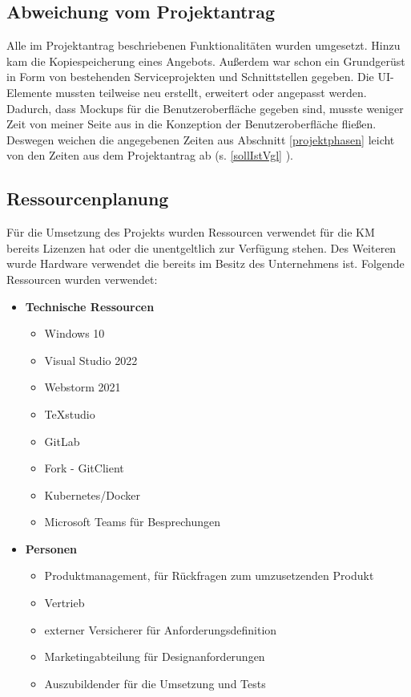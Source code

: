 {\subsection{Abweichung vom Projektantrag}
\label{abweichung}
Alle im Projektantrag beschriebenen Funktionalitäten wurden umgesetzt. Hinzu kam die Kopiespeicherung eines Angebots. Außerdem war schon ein Grundgerüst in Form von bestehenden Serviceprojekten und Schnittstellen gegeben. Die UI-Elemente mussten teilweise neu erstellt, erweitert oder angepasst werden.\\
Dadurch, dass Mockups für die Benutzeroberfläche gegeben sind, musste weniger Zeit von meiner Seite aus in die Konzeption der Benutzeroberfläche fließen. Deswegen weichen die angegebenen Zeiten aus Abschnitt \ref{projektphasen} leicht von den Zeiten aus dem Projektantrag ab (s. \ref{sollIstVgl} ). 
\subsection{Ressourcenplanung}
\label{ressourcenplanung}
Für die Umsetzung des Projekts wurden Ressourcen verwendet für die \ac{KM} bereits Lizenzen hat oder die unentgeltlich zur Verfügung stehen. Des Weiteren wurde Hardware verwendet die bereits im Besitz des Unternehmens ist.
Folgende Ressourcen wurden verwendet:

\begin{itemize}
	\item \textbf{Technische Ressourcen}
	\begin{itemize}
		\item Windows 10
		\item Visual Studio 2022
		\item Webstorm 2021
		\item TeXstudio
		\item GitLab
		\item Fork - GitClient
		\item Kubernetes/Docker
		\item Microsoft Teams für Besprechungen
	\end{itemize}
	\item \textbf{Personen}
	\begin{itemize}
	 	\item Produktmanagement, für Rückfragen zum umzusetzenden Produkt
	 	\item Vertrieb
	 	\item externer Versicherer für Anforderungsdefinition
		\item Marketingabteilung für Designanforderungen
		\item Auszubildender für die Umsetzung und Tests
	\end{itemize}
\end{itemize}

}
